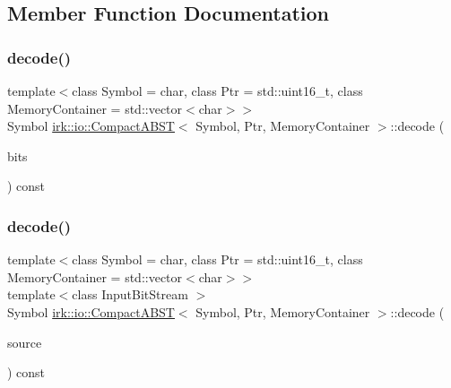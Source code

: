 \subsection{Member Function Documentation}
\mbox{\label{classirk_1_1io_1_1CompactABST_a4ba2b7511695ab2494250280d7166a55}} 
\subsubsection{\texorpdfstring{decode()}{decode()}\hspace{0.1cm}{\footnotesize\ttfamily [1/2]}}
{\footnotesize\ttfamily template$<$class Symbol = char, class Ptr = std\+::uint16\+\_\+t, class Memory\+Container = std\+::vector$<$char$>$$>$ \\
Symbol \mbox{\hyperlink{classirk_1_1io_1_1CompactABST}{irk\+::io\+::\+Compact\+A\+B\+ST}}$<$ Symbol, Ptr, Memory\+Container $>$\+::decode (\begin{DoxyParamCaption}\item[{const boost\+::dynamic\+\_\+bitset$<$ unsigned char $>$ \&}]{bits }\end{DoxyParamCaption}) const\hspace{0.3cm}{\ttfamily [inline]}}

\mbox{\label{classirk_1_1io_1_1CompactABST_a3d38e31d07dba9f6e90b03c8b5ce4e74}} 
\subsubsection{\texorpdfstring{decode()}{decode()}\hspace{0.1cm}{\footnotesize\ttfamily [2/2]}}
{\footnotesize\ttfamily template$<$class Symbol = char, class Ptr = std\+::uint16\+\_\+t, class Memory\+Container = std\+::vector$<$char$>$$>$ \\
template$<$class Input\+Bit\+Stream $>$ \\
Symbol \mbox{\hyperlink{classirk_1_1io_1_1CompactABST}{irk\+::io\+::\+Compact\+A\+B\+ST}}$<$ Symbol, Ptr, Memory\+Container $>$\+::decode (\begin{DoxyParamCaption}\item[{Input\+Bit\+Stream \&}]{source }\end{DoxyParamCaption}) const\hspace{0.3cm}{\ttfamily [inline]}}

